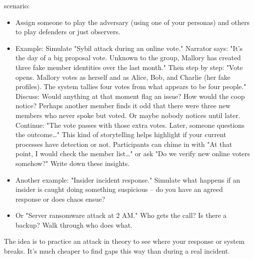\begin{itemize}
    scenario:
        \begin{itemize}   
            \item Assign someone to play the adversary (using one of your personas) and others to play
            defenders or just observers.
            \item Example: Simulate "Sybil attack during an online vote." Narrator says: "It's the day
            of a big proposal vote. Unknown to the group, Mallory has created three fake member identities over
            the last month." Then step by step: "Vote opens. Mallory votes as herself and as Alice, Bob, and
            Charlie (her fake profiles). The system tallies four votes from what appears to be four people."
            Discuss: Would anything at that moment flag an issue? How would the coop notice? Perhaps another
            member finds it odd that there were three new members who never spoke but voted. Or maybe nobody
            notices until later. Continue: "The vote passes with those extra votes. Later, someone questions the
            outcome…" This kind of storytelling helps highlight if your current processes have detection or not.
            Participants can chime in with "At that point, I would check the member list…" or ask "Do we verify
            new online voters somehow?" Write down these insights.
            \item Another example: "Insider incident response." Simulate what happens if an insider is
            caught doing something suspicious – do you have an agreed response or does chaos ensue?
            \item Or "Server ransomware attack at 2 AM." Who gets the call? Is there a backup? Walk
            through who does what.
        \end{itemize}
    The idea is to practice an attack in theory to see where your response or system breaks. It's
    much cheaper to find gaps this way than during a real incident.
    

\end{itemize}
